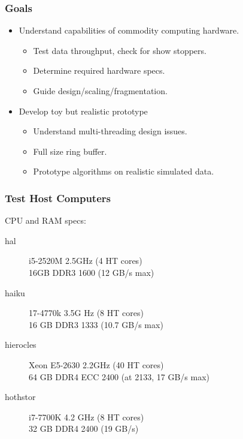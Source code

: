 \documentclass{beamer}
\begin{document}
\begin{frame}
  \frametitle{Goals}

  \begin{itemize}
  \item Understand capabilities of commodity computing hardware.
    \begin{itemize}
    \item Test data throughput, check for show stoppers.
    \item Determine required hardware specs.
    \item Guide design/scaling/fragmentation.
    \end{itemize}
  \item Develop toy but realistic prototype
    \begin{itemize}
    \item Understand multi-threading design issues.
    \item Full size ring buffer.
    \item Prototype algorithms on realistic simulated data.
    \end{itemize}
  \end{itemize}
\end{frame}

\begin{frame}
  \frametitle{Test Host Computers}
  
  CPU and RAM specs:
  \begin{description}
  \item[hal] i5-2520M 2.5GHz (4 HT cores) \\ 16GB DDR3 1600 (12 GB/s max)
  \item[haiku] 17-4770k 3.5G Hz (8 HT cores) \\ 16 GB DDR3 1333 (10.7 GB/s max)
  \item[hierocles] Xeon E5-2630 2.2GHz (40 HT cores) \\ 64 GB DDR4 ECC 2400 (at 2133, 17 GB/s max)
  \item[hothstor] i7-7700K 4.2 GHz (8 HT cores) \\ 32 GB DDR4 2400 (19 GB/s)
  \end{description}

\end{frame}
\end{document}
